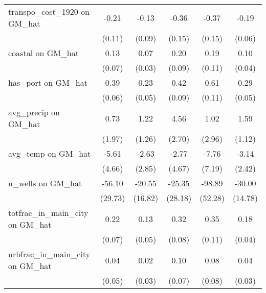 {\begin{tabular}{l*{5}{c}}
\addlinespace
transpo\_cost\_1920 on GM\_hat&    -0.21\sym{*}  &    -0.13         &    -0.36\sym{*}  &    -0.37\sym{*}  &    -0.19\sym{**} \\
                &   (0.11)         &   (0.09)         &   (0.15)         &   (0.15)         &   (0.06)         \\
\addlinespace
coastal on GM\_hat&     0.13         &     0.07         &     0.20\sym{*}  &     0.19         &     0.10\sym{**} \\
                &   (0.07)         &   (0.03)         &   (0.09)         &   (0.11)         &   (0.04)         \\
\addlinespace
has\_port on GM\_hat&     0.39\sym{***}&     0.23\sym{***}&     0.42\sym{***}&     0.61\sym{***}&     0.29\sym{***}\\
                &   (0.06)         &   (0.05)         &   (0.09)         &   (0.11)         &   (0.05)         \\
\addlinespace
avg\_precip on GM\_hat&     0.73         &     1.22         &     4.56         &     1.02         &     1.59         \\
                &   (1.97)         &   (1.26)         &   (2.70)         &   (2.96)         &   (1.12)         \\
\addlinespace
avg\_temp on GM\_hat&    -5.61         &    -2.63         &    -2.77         &    -7.76         &    -3.14         \\
                &   (4.66)         &   (2.85)         &   (4.67)         &   (7.19)         &   (2.42)         \\
\addlinespace
n\_wells on GM\_hat&   -56.10         &   -20.55         &   -25.35         &   -98.89         &   -30.00\sym{*}  \\
                &  (29.73)         &  (16.82)         &  (28.18)         &  (52.28)         &  (14.78)         \\
\addlinespace
totfrac\_in\_main\_city on GM\_hat&     0.22\sym{**} &     0.13\sym{**} &     0.32\sym{***}&     0.35\sym{**} &     0.18\sym{***}\\
                &   (0.07)         &   (0.05)         &   (0.08)         &   (0.11)         &   (0.04)         \\
\addlinespace
urbfrac\_in\_main\_city on GM\_hat&     0.04         &     0.02         &     0.10         &     0.08         &     0.04         \\
                &   (0.05)         &   (0.03)         &   (0.07)         &   (0.08)         &   (0.03)         \\

\end{tabular}}
